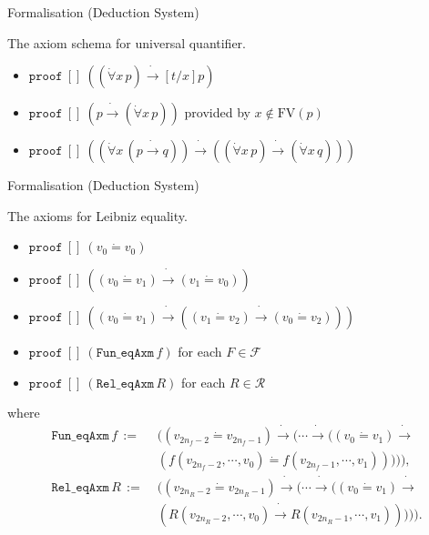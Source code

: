 \documentclass[serif,table,10pt]{beamer}
\newcommand{\0}{\texttt{0}}
\newcommand{\1}{\texttt{1}}
\newcommand{\FV}{\mathrm{FV}}
\newcommand{\proves}[2]{\mathtt{proof}\ #1\ #2 }
\newcommand{\listunit}[1]{[#1]}
\newcommand{\Leq}{\mathrel{\dot{=}}}
\newcommand{\Lto}{\mathrel{\dot{\to}}}
\newcommand{\Lall}[1]{\dot{\forall}#1\,}
\begin{document}
\begin{frame}{Formalisation (Deduction System)}

    The axiom schema for universal quantifier.

    \begin{itemize}
        \item $\proves{ \listunit{} }{ ((\Lall{x} p) \Lto [t / x] p) }$
        \item $\proves{ \listunit{} }{ (p \Lto (\Lall{x} p)) }$ provided by $ x \notin \FV ( p ) $
        \item $\proves{ \listunit{} }{ ((\Lall{x} (p \Lto q)) \Lto ((\Lall{x} p) \Lto (\Lall{x} q))) }$
    \end{itemize}

\end{frame}

\begin{frame}{Formalisation (Deduction System)}

    The axioms for Leibniz equality.

    \begin{itemize}
        \item $\proves{ \listunit{} }{ ( v_0 \Leq v_0 ) }$
        \item $\proves{ \listunit{} }{ ( ( v_0 \Leq v_1 ) \Lto ( v_1 \Leq v_0 ) ) }$
        \item $\proves{ \listunit{} }{ ( ( v_0 \Leq v_1 ) \Lto ( ( v_1 \Leq v_2 ) \Lto ( v_0 \Leq v_2 ) ) ) }$
        \item $\proves{ \listunit{} }{(\mathtt{Fun\_eqAxm} \, f)}$ for each $F \in \mathcal{F}$
        \item $\proves{ \listunit{} }{(\mathtt{Rel\_eqAxm} \, R)}$ for each $R \in \mathcal{R}$
    \end{itemize}
    where
    \begin{align*}
        \mathtt{Fun\_eqAxm} \, f \, := \; & ( ( v_{2 n_f - 2} \Leq v_{2 n_f - 1} ) \Lto ( \cdots \Lto ( ( v_0 \Leq v_1 ) \Lto \\ & ( f ( v_{2 n_f - 2} , \cdots , v_0 ) \Leq f ( v_{2 n_f - 1} , \cdots , v_1 ) ) ) ) ) , \\
        \mathtt{Rel\_eqAxm} \, R \, := \; & ( ( v_{2 n_R - 2} \Leq v_{2 n_R - 1} ) \Lto ( \cdots \Lto ( ( v_0 \Leq v_1 ) \Lto \\ & ( R ( v_{2 n_R - 2} , \cdots , v_0 ) \Lto R ( v_{2 n_R - 1} , \cdots , v_1 ) ) ) ) ) .
    \end{align*}

\end{frame}
\end{document}
